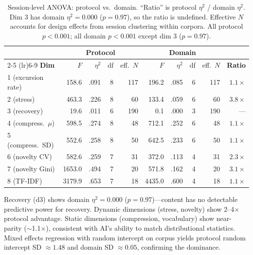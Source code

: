 \documentclass[final]{clv2025}
\begin{document}
\begin{table}[h!]
\centering
\footnotesize
\caption{Session-level ANOVA: protocol vs.\ domain. ``Ratio'' is protocol $\eta^2$ / domain $\eta^2$. Dim 3 has domain $\eta^2 = 0.000$ ($p = 0.97$), so the ratio is undefined. Effective $N$ accounts for design effects from session clustering within corpora. All protocol $p < 0.001$; all domain $p < 0.001$ except dim 3 ($p = 0.97$).}
\label{tbl:session-anova}
\begin{tabular}{l rrrr rrrr r}
\toprule
& \multicolumn{4}{c}{\textbf{Protocol}} & \multicolumn{4}{c}{\textbf{Domain}} & \\
\cmidrule(lr){2-5} \cmidrule(lr){6-9}
\textbf{Dim} & $F$ & $\eta^2$ & df & eff.\ $N$ & $F$ & $\eta^2$ & df & eff.\ $N$ & \textbf{Ratio} \\
\midrule
1 (excursion rate)   & 158.6 & .091 & 8 & 117 & 196.2 & .085 & 6 & 117 & $1.1\times$ \\
2 (stress)      & 463.3 & .226 & 8 &  60 & 133.4 & .059 & 6 &  60 & $3.8\times$ \\
3 (recovery)    &  19.6 & .011 & 6 & 190 &   0.1 & .000 & 3 & 190 & --- \\
4 (compress.\ $\mu$) & 598.5 & .274 & 8 & 48 & 712.1 & .252 & 6 & 48 & $1.1\times$ \\
5 (compress.\ SD)    & 552.6 & .258 & 8 & 50 & 642.5 & .233 & 6 & 50 & $1.1\times$ \\
6 (novelty CV)  & 582.6 & .259 & 7 &  31 & 372.0 & .113 & 4 &  31 & $2.3\times$ \\
7 (novelty Gini) & 1653.0 & .494 & 7 & 20 & 571.8 & .162 & 4 & 20 & $3.1\times$ \\
8 (TF-IDF)      & 3179.9 & .653 & 7 &  18 & 4435.0 & .600 & 4 & 18 & $1.1\times$ \\
\bottomrule
\end{tabular}
\end{table}

Recovery (d3) shows domain $\eta^2 = 0.000$ ($p = 0.97$)---content has no detectable predictive power for recovery. Dynamic dimensions (stress, novelty) show 2--4$\times$ protocol advantage. Static dimensions (compression, vocabulary) show near-parity ($\sim$1.1$\times$), consistent with AI's ability to match distributional statistics. Mixed effects regression with random intercept on corpus yields protocol random intercept SD $\approx 1.48$ and domain SD $\approx 0.05$, confirming the dominance.

\label{app:compact-vector}
\end{document}

